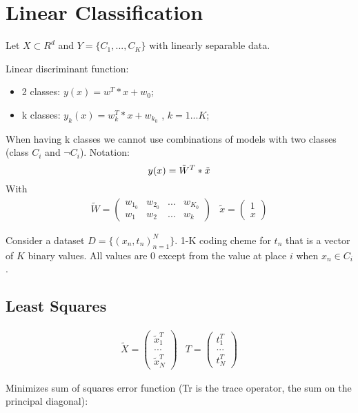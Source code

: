 \section{Linear Classification}

Let $X \subset R^d$ and $Y = \{C_1, ..., C_K\}$ with linearly separable data.

Linear discriminant function:
\begin{itemize}
    \item 2 classes: $y(x) = w^T*x + w_0$;
    \item k classes: $y_k(x) = w_k^T*x + w_{k_0}$ , $k = 1...K$;
\end{itemize}

When having k classes we cannot use combinations of models with two classes (class $C_i$ and $\lnot C_i$).
Notation:
\[
y(x) = \tilde W^T * \tilde x \\
\]
With \[
\begin{array}{ll}
    \tilde W = \begin{pmatrix} w_{1_0} & w_{2_0} & ... & w_{K_0} \\
    w_1 & w_2 & ... & w_k
    \end{pmatrix}
    & \tilde x = \begin{pmatrix} 1 \\ x \end{pmatrix}
\end{array}
\]

Consider a dataset $D = \{(x_n, t_n)_{n=1}^N\}$.
1-K coding cheme for $t_n$ that is a vector of $K$ binary values. All values are 0 except from the value at place $i$ when $x_n \in C_i$.

\subsection{Least Squares}

\[
\begin{array}{ll}
    \tilde{X} = \begin{pmatrix} \tilde{x}_1^T \\ ... \\ \tilde{x}_N^T \end{pmatrix} & T = \begin{pmatrix} t_1^T \\ ... \\ t_N^T \end{pmatrix}
\end{array}
\]

Minimizes sum of squares error function (Tr is the trace operator, the sum on the principal diagonal):

